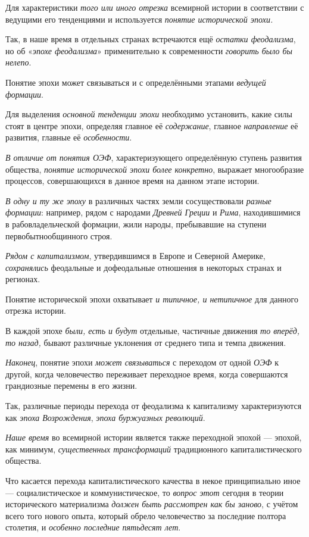 \documentclass[a4paper,14pt,russian]{extreport}
\begin{document}
Для характеристики \emph{того или иного отрезка} всемирной истории в соответствии с ведущими его тенденциями и используется \emph{понятие исторической эпохи.}

Так, в наше время в отдельных странах встречаются ещё \emph{остатки феодализма}, но об «\emph{эпохе феодализма}» применительно к современности \emph{говорить было бы нелепо}.

Понятие эпохи может связываться и с определёнными этапами \emph{ведущей формации}.

Для выделения \emph{основной тенденции эпохи} необходимо установить, какие силы стоят в центре эпохи, определяя главное её \emph{содержание}, главное \emph{направление} её развития, главные её \emph{особенности}.

\emph{В отличие от понятия ОЭФ}, характеризующего определённую ступень развития общества, \emph{понятие исторической эпохи более конкретно}, выражает многообразие процессов, совершающихся в данное время на данном этапе истории.

\emph{В одну и ту же эпоху} в различных частях земли сосуществовали \emph{разные формации}: например, рядом с народами \emph{Древней Греции} и \emph{Рима}, находившимися в рабовладельческой формации, жили народы, пребывавшие на ступени первобытнообщинного строя.

\emph{Рядом с капитализмом}, утвердившимся в Европе и Северной Америке, \emph{сохранялись} феодальные и дофеодальные отношения в некоторых странах и регионах.

Понятие исторической эпохи охватывает \emph{и типичное, и нетипичное} для данного отрезка истории.

В каждой эпохе \emph{были, есть и будут} отдельные, частичные движения \emph{то вперёд, то назад,} бывают различные уклонения от среднего типа и темпа движения.

\emph{Наконец}, понятие эпохи \emph{может связываться} с переходом от одной \emph{ОЭФ} к другой, когда человечество переживает переходное время, когда совершаются грандиозные перемены в его жизни.

Так, различные периоды перехода от феодализма к капитализму характеризуются как \emph{эпоха Возрождения}, \emph{эпоха буржуазных революций}.

\emph{Наше время} во всемирной истории является также переходной эпохой --- эпохой, как минимум, \emph{существенных трансформаций} традиционного капиталистического общества.

Что касается перехода капиталистического качества в некое принципиально иное --- социалистическое и коммунистическое, то \emph{вопрос этот} сегодня в теории исторического материализма \emph{должен быть} \emph{рассмотрен как бы заново}, с учётом всего того нового опыта, который обрело человечество за последние полтора столетия, и \emph{особенно последние пятьдесят лет}.
\end{document}
